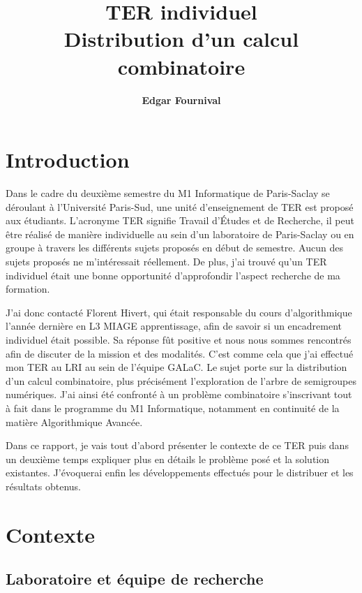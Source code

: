 \documentclass[12pt,a4paper]{report}
\title{\bfseries\LARGE TER individuel\\[0.5em]\Huge Distribution d'un calcul combinatoire}
\author{\bfseries\Large Edgar Fournival}
\date{}
\begin{document}
\maketitle

\tableofcontents

\chapter*{Introduction}

Dans le cadre du deuxième semestre du M1 Informatique de Paris-Saclay se déroulant à l'Université Paris-Sud, une unité d'enseignement de TER est proposé aux étudiants. L'acronyme TER signifie Travail d'Études et de Recherche, il peut être réalisé de manière individuelle au sein d'un laboratoire de Paris-Saclay ou en groupe à travers les différents sujets proposés en début de semestre. Aucun des sujets proposés ne m'intéressait réellement. De plus, j'ai trouvé qu'un TER individuel était une bonne opportunité d'approfondir l'aspect recherche de ma formation.

J'ai donc contacté Florent Hivert, qui était responsable du cours d'algorithmique l'année dernière en L3 MIAGE apprentissage, afin de savoir si un encadrement individuel était possible. Sa réponse fût positive et nous nous sommes rencontrés afin de discuter de la mission et des modalités. C'est comme cela que j'ai effectué mon TER au LRI au sein de l'équipe GALaC. Le sujet porte sur la distribution d'un calcul combinatoire, plus précisément l'exploration de l'arbre de semigroupes numériques. J'ai ainsi été confronté à un problème combinatoire s'inscrivant tout à fait dans le programme du M1 Informatique, notamment en continuité de la matière Algorithmique Avancée.

Dans ce rapport, je vais tout d'abord présenter le contexte de ce TER puis dans un deuxième temps expliquer plus en détails le problème posé et la solution existantes. J'évoquerai enfin les développements effectués pour le distribuer et les résultats obtenus.

\chapter{Contexte}

\section{Laboratoire et équipe de recherche}
\end{document}
